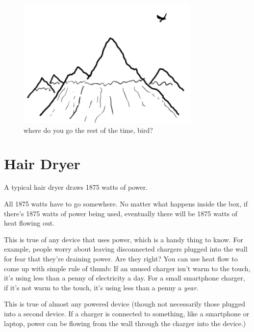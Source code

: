 \begin{figure}[!htbp]
\centering
\includegraphics[scale=0.5, max width=0.8\textwidth]{imgs/a/34/twitter_bird.png}
\caption{where do you go the rest of the time, bird?}
\end{figure}

{
\chapter{Hair Dryer}
}

\hfill{}

{A typical hair dryer draws 1875 watts of power.}

{All 1875 watts have to go somewhere. No matter what happens inside the box, if there’s 1875 watts of power being used, eventually there will be 1875 watts of heat flowing out.}

{This is true of any device that uses power, which is a handy thing to know. For example, people worry about leaving disconnected chargers plugged into the wall for fear that they’re draining power. Are they right? You can use heat flow to come up with simple rule of thumb: If an unused charger isn’t warm to the touch, it’s using less than a penny of electricity a day. For a small smartphone charger, if it’s not warm to the touch, it’s using less than a penny a \emph{year}.}

{This is true of almost any powered device (though not necessarily those plugged into a second device. If a charger is connected to something, like a smartphone or laptop, power can be flowing from the wall through the charger into the device.)}

